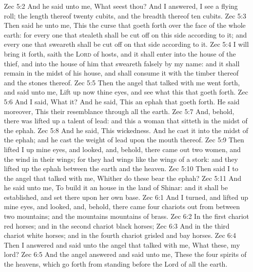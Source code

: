 \vs Zec 5:2 And he said unto me, What seest thou? And I answered, I see a flying roll; the length thereof  twenty cubits, and the breadth thereof ten cubits.
\vs Zec 5:3 Then said he unto me, This  the curse that goeth forth over the face of the whole earth: for every one that stealeth shall be cut off  on this side according to it; and every one that sweareth shall be cut off  on that side according to it.
\vs Zec 5:4 I will bring it forth, saith the \textsc{Lord} of hosts, and it shall enter into the house of the thief, and into the house of him that sweareth falsely by my name: and it shall remain in the midst of his house, and shall consume it with the timber thereof and the stones thereof.
\vs Zec 5:5 Then the angel that talked with me went forth, and said unto me, Lift up now thine eyes, and see what  this that goeth forth.
\vs Zec 5:6 And I said, What  it? And he said, This  an ephah that goeth forth. He said moreover, This  their resemblance through all the earth.
\vs Zec 5:7 And, behold, there was lifted up a talent of lead: and this  a woman that sitteth in the midst of the ephah.
\vs Zec 5:8 And he said, This  wickedness. And he cast it into the midst of the ephah; and he cast the weight of lead upon the mouth thereof.
\vs Zec 5:9 Then lifted I up mine eyes, and looked, and, behold, there came out two women, and the wind  in their wings; for they had wings like the wings of a stork: and they lifted up the ephah between the earth and the heaven.
\vs Zec 5:10 Then said I to the angel that talked with me, Whither do these bear the ephah?
\vs Zec 5:11 And he said unto me, To build it an house in the land of Shinar: and it shall be established, and set there upon her own base.
\vs Zec 6:1 And I turned, and lifted up mine eyes, and looked, and, behold, there came four chariots out from between two mountains; and the mountains  mountains of brass.
\vs Zec 6:2 In the first chariot  red horses; and in the second chariot black horses;
\vs Zec 6:3 And in the third chariot white horses; and in the fourth chariot grisled and bay horses.
\vs Zec 6:4 Then I answered and said unto the angel that talked with me, What  these, my lord?
\vs Zec 6:5 And the angel answered and said unto me, These  the four spirits of the heavens, which go forth from standing before the Lord of all the earth.
